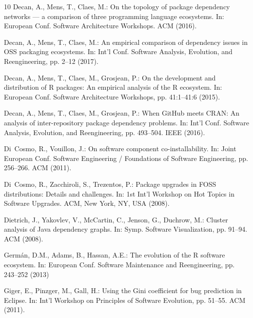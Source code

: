 \documentclass[smallextended]{svjour3}       %
\begin{document}
\begin{thebibliography}{10}
Decan, A., Mens, T., Claes, M.: On the topology of package dependency networks
  --- a comparison of three programming language ecosystems.
\newblock In: European Conf. Software Architecture Workshops. { ACM } (2016).
\newblock {}

Decan, A., Mens, T., Claes, M.: An empirical comparison of dependency issues in
  {OSS} packaging ecosystems.
\newblock In: Int'l Conf. Software Analysis, Evolution, and Reengineering, pp.
  2--12 (2017).
\newblock {}

Decan, A., Mens, T., Claes, M., Grosjean, P.: On the development and
  distribution of {R} packages: An empirical analysis of the {R} ecosystem.
\newblock In: European Conf. Software Architecture Workshops, pp. 41:1--41:6
  (2015).
\newblock {}

Decan, A., Mens, T., Claes, M., Grosjean, P.: When {GitHub} meets {CRAN}: An
  analysis of inter-repository package dependency problems.
\newblock In: Int'l Conf. Software Analysis, Evolution, and Reengineering, pp.
  493--504. {IEEE} (2016).
\newblock {}

Di~Cosmo, R., Vouillon, J.: On software component co-installability.
\newblock In: Joint European Conf. Software Engineering / Foundations of
  Software Engineering, pp. 256--266. ACM (2011).
\newblock {}

Di~Cosmo, R., Zacchiroli, S., Trezentos, P.: Package upgrades in {FOSS}
  distributions: Details and challenges.
\newblock In: 1st Int'l Workshop on Hot Topics in Software Upgrades. ACM, New
  York, NY, USA (2008).
\newblock {}

Dietrich, J., Yakovlev, V., McCartin, C., Jenson, G., Duchrow, M.: Cluster
  analysis of {Java} dependency graphs.
\newblock In: Symp. Software Visualization, pp. 91--94. ACM (2008).
\newblock {}

Germ{\'a}n, D.M., Adams, B., Hassan, A.E.: The evolution of the {R} software
  ecosystem.
\newblock In: European Conf. Software Maintenance and Reengineering, pp.
  243--252 (2013)

Giger, E., Pinzger, M., Gall, H.: Using the {Gini} coefficient for bug
  prediction in {Eclipse}.
\newblock In: Int'l Workshop on Principles of Software Evolution, pp. 51--55. {
  ACM } (2011).
\newblock {}


\end{thebibliography}
\end{document}
